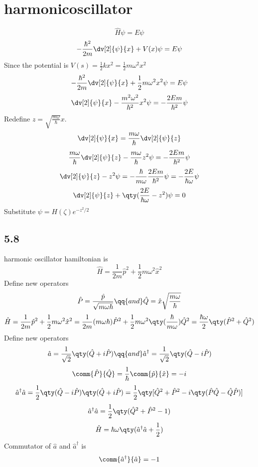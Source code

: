 \section*{harmonicoscillator}

\[\hat{H}\psi=E\psi\]
\[-\frac{\hbar^2}{2m}\dv[2]{\psi}{x}+V(x)\psi=E\psi\]
Since the potential is $V(s)=\frac{1}{2}kx^2=\frac{1}{2}m\omega^2x^2$
\[-\frac{\hbar^2}{2m}\dv[2]{\psi}{x}+\frac{1}{2}m\omega^2x^2\psi=E\psi\]
\[\dv[2]{\psi}{x}-\frac{m^2\omega^2}{\hbar^2}x^2\psi=-\frac{2Em}{\hbar^2}\psi\]
Redefine $z=\sqrt{\frac{m\omega}{\hbar}}x$.
\[\dv[2]{\psi}{x}=\frac{m\omega}{\hbar}\dv[2]{\psi}{z}\]
\[\frac{m\omega}{\hbar}\dv[2]{\psi}{z}-\frac{m\omega}{\hbar}z^2\psi=-\frac{2Em}{\hbar^2}\psi\]
\[\dv[2]{\psi}{z}-z^2\psi=-\frac{\hbar}{m\omega}\frac{2Em}{\hbar^2}\psi=-\frac{2E}{\hbar\omega}\psi\]
\[\dv[2]{\psi}{z}+\qty(\frac{2E}{\hbar\omega}-z^2)\psi=0\]
Substitute $\psi=H(\zeta)e^{-z^2/2}$	
\subsection*{5.8}
harmonic oscillator hamiltonian is \[\hat{H}=\frac{1}{2m}\hat{p}^2+\frac{1}{2}m\omega^2\hat{x}^2\]
Define new operators \[\hat{P}=\frac{\hat{p}}{\sqrt{m\omega\hbar}}\qq{and} 
\hat{Q}=\hat{x}\sqrt{\frac{m\omega}{\hbar}}\]
\[\hat{H}=\frac{1}{2m}\hat{p}^2+\frac{1}{2}m\omega^2\hat{x}^2=\frac{1}{2m}(m\omega\hbar)\hat{P}^2+
\frac{1}{2}m\omega^2\qty(\frac{\hbar}{m\omega})\hat{Q}^2=
\frac{\hbar\omega}{2}\qty(\hat{P}^2+\hat{Q}^2)\]
Define new operators \[\hat{a}=\frac{1}{\sqrt{2}}\qty(\hat{Q}+i\hat{P})\qq{and}
\hat{a}^{\dagger}=\frac{1}{\sqrt{2}}\qty(\hat{Q}-i\hat{P})\]
\[\comm{\hat{P}}{\hat{Q}}=\frac{1}{\hbar}\comm{\hat{p}}{\hat{x}}=-i\]
\[\hat{a}^{\dagger}\hat{a}=\frac{1}{2}\qty(\hat{Q}-i\hat{P})\qty(\hat{Q}+i\hat{P})=\frac{1}{2}\qty[\hat{Q}^2+\hat{P}^2-i\qty(\hat{P}\hat{Q}-\hat{Q}\hat{P})]\]
\[\hat{a}^{\dagger}\hat{a}=\frac{1}{2}\qty(\hat{Q}^2+\hat{P}^2-1)\]
\[\hat{H}=\hbar\omega\qty(\hat{a}^{\dagger}\hat{a}+\frac{1}{2})\]
Commutator of $\hat{a}$ and $\hat{a}^{\dagger}$ is \[\comm{\hat{a}^{\dagger}}{\hat{a}}=-1\]

